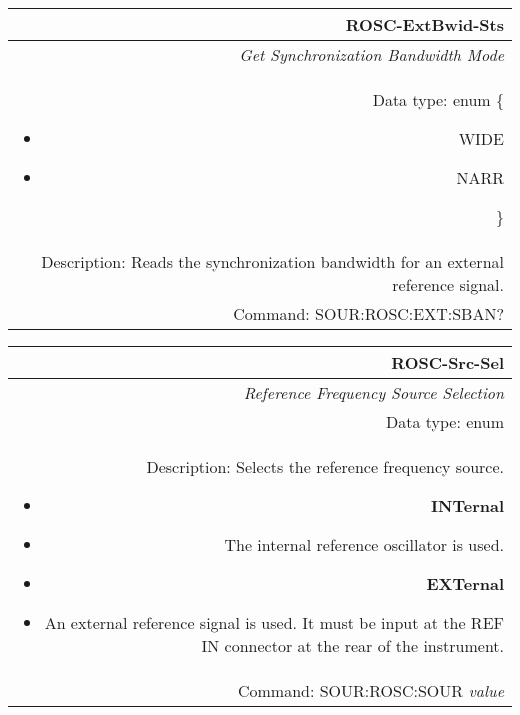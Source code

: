 \documentclass[openany]{article}
\begin{document}
		\begin{tabular}{N}
			\hline
			\bfseries ROSC-ExtBwid-Sts \\ \hline
			\emph{Get Synchronization Bandwidth Mode} \\
			Data type: enum \{\begin{itemize}[noitemsep]
				\small
				\item[] WIDE
				\item[] NARR
			\end{itemize}\} \\ 
			Description: Reads the synchronization bandwidth for an external reference signal. \\
			Command: SOUR:ROSC:EXT:SBAN? \\

		\end{tabular}
%
		\begin{tabular}{N}
			\hline
			\bfseries ROSC-Src-Sel \\ \hline
			\emph{Reference Frequency Source Selection} \\
			Data type: enum \\   
			Description: Selects the reference frequency source.\begin{itemize}[noitemsep]
				\small
				\item[] \textbf{INTernal}
				\item[] The internal reference oscillator is used.
                                \item[] \textbf{EXTernal}
				\item[] An external reference signal is used. It must be input at the REF IN connector at the rear of the instrument.
			\end{itemize} \\
			Command: SOUR:ROSC:SOUR \emph{value} \\

		\end{tabular}
\end{document}
